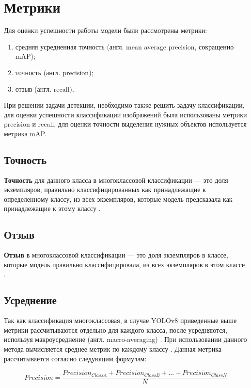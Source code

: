 \section{Метрики}
Для оценки успешности работы модели были рассмотрены метрики:
\begin{enumerate}
	\item средняя усредненная точность (англ. mean average precision, сокращенно mAP);
	\item точность (англ. precision);
	\item отзыв (англ. recall).
\end{enumerate}

При решении задачи детекции, необходимо  также решить задачу классификации, для оценки успешности классификации изображений была использованы метрики precision  
и recall, для оценки точности выделения нужных объектов используется метрика mAP. 

\subsection{Точность}
\textbf{Точность} для данного класса в многоклассовой классификации --- это доля экземпляров, правильно классифицированных как принадлежащие к определенному классу, из всех экземпляров, которые модель предсказала как принадлежащие к этому классу \cite{class_metrics}.

\subsection{Отзыв}
\textbf{Отзыв} в многоклассовой классификации --- это доля экземпляров в классе, которые модель правильно классифицировала, из всех экземпляров в этом классе \cite{class_metrics}.

\subsection{Усреднение}
Так как классификация многоклассовая, в случае YOLOv8 приведенные выше метрики рассчитываются отдельно для каждого класса, после усредняются, используя макроусреднение (англ. macro-averaging) \cite{YOLOv8}. При использовании данного метода вычисляется среднее метрик по каждому классу \cite{class_metrics}. Данная метрика рассчитывается согласно следующим формулам:

\begin{equation}
\label{eq:precision}
Precision = \frac{Precision_{Class A} + Precision_{Class B} + ... + Precision_{Class N}}{N}
\end{equation}

